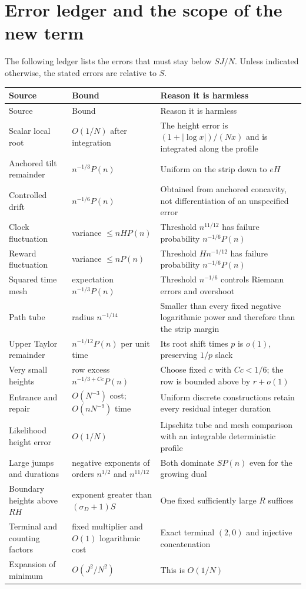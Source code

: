 \documentclass[11pt,letterpaper]{article}
\theoremstyle{remark}\newtheorem{remark}[theorem]{Remark}
\numberwithin{equation}{section}
\begin{document}
\section{Error ledger and the scope of the new term}\label{ivd:ll:sec:ledger}
The following ledger lists the errors that must stay below $SJ/N$.
Unless indicated otherwise, the stated errors are relative to $S$.
\begin{longtable}{@{}p{}p{}p{}@{}}
\toprule
Source & Bound & Reason it is harmless \\\midrule
\endfirsthead
\toprule
Source & Bound & Reason it is harmless \\\midrule
\endhead
Scalar local root & $O(1/N)$ after integration & The height error is $(1+|\log x|)/(Nx)$ and is integrated along the profile \\
Anchored tilt remainder & $n^{-1/3}P(n)$ & Uniform on the strip down to $eH$ \\
Controlled drift & $n^{-1/6}P(n)$ & Obtained from anchored concavity, not differentiation of an unspecified error \\
Clock fluctuation & variance $\le nHP(n)$ & Threshold $n^{11/12}$ has failure probability $n^{-1/6}P(n)$ \\
Reward fluctuation & variance $\le nP(n)$ & Threshold $Hn^{-1/12}$ has failure probability $n^{-1/6}P(n)$ \\
Squared time mesh & expectation $n^{-1/3}P(n)$ & Threshold $n^{-1/6}$ controls Riemann errors and overshoot \\
Path tube & radius $n^{-1/14}$ & Smaller than every fixed negative logarithmic power and therefore than the strip margin \\
Upper Taylor remainder & $n^{-1/12}P(n)$ per unit time & Its root shift times $p$ is $o(1)$, preserving $1/p$ slack \\
Very small heights & row excess $n^{-1/3+Cc}P(n)$ & Choose fixed $c$ with $Cc<1/6$; the row is bounded above by $r+o(1)$ \\
Entrance and repair & $O(N^{-3})$ cost; $O(nN^{-9})$ time & Uniform discrete constructions retain every residual integer duration \\
Likelihood height error & $O(1/N)$ & Lipschitz tube and mesh comparison with an integrable deterministic profile \\
Large jumps and durations & negative exponents of orders $n^{1/2}$ and $n^{11/12}$ & Both dominate $SP(n)$ even for the growing dual \\
Boundary heights above $RH$ & exponent greater than $(\sigma_D+1)S$ & One fixed sufficiently large $R$ suffices \\
Terminal and counting factors & fixed multiplier and $O(1)$ logarithmic cost & Exact terminal $(2,0)$ and injective concatenation \\
Expansion of minimum & $O(J^2/N^2)$ & This is $O(1/N)$ \\\bottomrule
\end{longtable}
\end{document}
